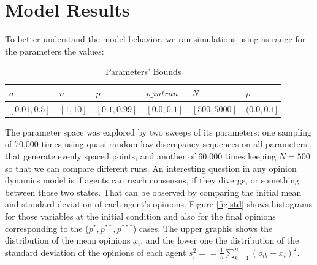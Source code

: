 \documentclass{article}
\begin{document}
  \section{Model Results}

  To better understand the model behavior, we ran simulations using as range for the parameters the values:  

  \begin{table}[H]
    \centering
\begin{tabular}{@{}|l|l|l|l|l|l|@{}}
\toprule
\rowcolor[HTML]{EFEFEF} 
$\sigma$ & $n$ & $p$ & $p\_intran$ & $N$ & $\rho$ \\ \midrule
$[0.01, 0.5]$ & $[1, 10]$  & $[0.1, 0.99]$ & $[0.0, 0.1]$ & $[500, 5000]$ & $(0.0, 0.1]$ \\ \bottomrule
\end{tabular}
\caption{Parameters' Bounds}
\end{table}

The parameter space was explored by two sweeps of its parameters: one sampling
of 70,000 times using quasi-random low-discrepancy sequences on all parameters
\cite{saltelli2008global}, that generate evenly spaced points, and another of
60,000 times keeping \(N=500\) so that we can compare different runs. An
interesting question in any opinion dynamics model is if agents can reach
consensus, if they diverge, or something between those two states. That can be observed by comparing the initial mean and standard
deviation of each agent's opinions. Figure \ref{fig:std} shows histograms for
those variables at the initial condition and also for the final opinions corresponding to the (\(p^{*}, p^{**}, p^{***}\)) cases. The upper graphic shows the distribution of the mean opinions $x_i$, and the lower one the distribution of the standard deviation of the opinions of each agent $s_i^2==
\frac{1}{n}
\sum_{k=1}^{n}
(o_{ik}-x_i)^2$.
\end{document}
